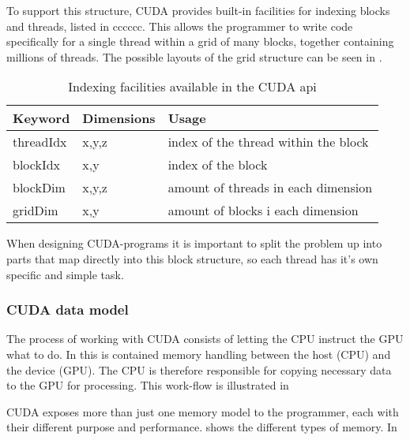 To support this structure, CUDA provides built-in facilities for indexing blocks and threads, listed in cccccc. This allows the programmer to write code specifically for a single thread within a grid of many blocks, together containing millions of threads. The possible layouts of the grid structure can be seen in .

\begin{table}[htb]
	\centering
	\begin{tabular}{lll}
		\toprule
		Keyword & Dimensions & Usage \\
		\midrule
		threadIdx & x,y,z & index of the thread within the block \\
		blockIdx & x,y & index of the block  \\
		blockDim & x,y,z & amount of threads in each dimension \\
		gridDim & x,y & amount of blocks i each dimension \\
		\bottomrule
	\end{tabular}
	\caption{Indexing facilities available in the CUDA api}
	\label{cudaindex}
\end{table}


\newpage
{}

When designing CUDA-programs it is important to split the problem up into parts that map directly into this block structure, so each thread has it's own specific and simple task.


\newpage
\subsubsection{CUDA data model}
The process of working with CUDA consists of letting the CPU instruct the GPU what to do. In this is contained memory handling between the host (CPU) and the device (GPU). The CPU is therefore responsible for copying necessary data to the GPU for processing. This work-flow is illustrated in 


CUDA exposes more than just one memory model to the programmer, each with their different purpose and performance.  shows the different types of memory. In 

